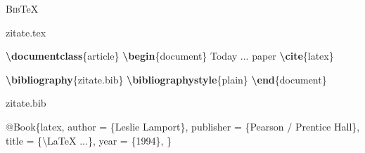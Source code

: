 \documentclass[aspectratio=169]{beamer}
\newenvironment{Shaded}{\begin{snugshade}}{\end{snugshade}}
\newcommand{\BuiltInTok}[1]{\textcolor[rgb]{0.25,0.67,0.19}{\textbf{#1}}}
\newcommand{\CharTok}[1]{\textcolor[rgb]{0.46,0.36,0.71}{#1}}
\newcommand{\CommentTok}[1]{\textcolor[rgb]{0.57,0.57,0.57}{\textit{#1}}}
\newcommand{\DataTypeTok}[1]{\textcolor[rgb]{0.24,0.65,0.58}{#1}}
\newcommand{\ExtensionTok}[1]{\textcolor[rgb]{0.25,0.67,0.19}{#1}}
\newcommand{\KeywordTok}[1]{\textcolor[rgb]{0.25,0.67,0.19}{\textbf{#1}}}
\newcommand{\NormalTok}[1]{\textcolor[rgb]{0.19,0.19,0.19}{#1}}
\newcommand{\OtherTok}[1]{\textcolor[rgb]{0.19,0.19,0.19}{#1}}
\newcommand{\VariableTok}[1]{\textcolor[rgb]{0.44,0.55,0.28}{#1}}
\newenvironment{Shaded}{}{}
\begin{document}
    \begin{frame}[fragile]{\textsc{Bib}\TeX}
    \protect\hypertarget{section-1}{}
    \begin{minipage}{0.495\textwidth}

    zitate.tex

\begin{Shaded}
\begin{Highlighting}[]
\BuiltInTok{\textbackslash{}documentclass}\NormalTok{\{}\ExtensionTok{article}\NormalTok{\}}
\KeywordTok{\textbackslash{}begin}\NormalTok{\{}\ExtensionTok{document}\NormalTok{\}}
\NormalTok{\textasciigrave{}\textasciigrave{}Today ... paper\textquotesingle{}\textquotesingle{} }
\KeywordTok{\textbackslash{}cite}\NormalTok{\{}\ExtensionTok{latex}\NormalTok{\}}

\BuiltInTok{\textbackslash{}bibliography}\NormalTok{\{}\ExtensionTok{zitate.bib}\NormalTok{\}}
\BuiltInTok{\textbackslash{}bibliographystyle}\NormalTok{\{}\ExtensionTok{plain}\NormalTok{\}}
\KeywordTok{\textbackslash{}end}\NormalTok{\{}\ExtensionTok{document}\NormalTok{\}}
\end{Highlighting}
\end{Shaded}

    \end{minipage}\begin{minipage}{0.01\textwidth}

    \phantom{x}

    \end{minipage}\begin{minipage}{0.495\textwidth}

    zitate.bib

\begin{Shaded}
\begin{Highlighting}[]
\VariableTok{@Book}\NormalTok{\{}\OtherTok{latex}\NormalTok{,}
  \DataTypeTok{author}\NormalTok{ = \{Leslie Lamport\},}
  \DataTypeTok{publisher}\NormalTok{ = \{Pearson }
\NormalTok{      / Prentice Hall\},}
  \DataTypeTok{title}\NormalTok{ = \{}\CharTok{\textbackslash{}LaTeX}\NormalTok{ ...\},}
  \DataTypeTok{year}\NormalTok{ = \{1994\},}
\NormalTok{\}}
\CommentTok{ }
\end{Highlighting}
\end{Shaded}

    \end{minipage}

    \vspace{0.2\baselineskip}

    \begin{minipage}{0.495\textwidth}


\end{minipage}
\end{frame}
\end{document}

